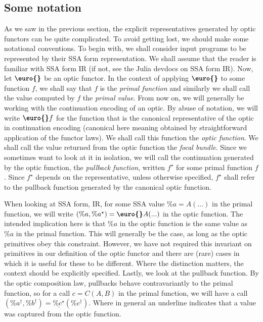 \documentclass[letterpaper, 10 pt, conference]{ieeeconf}  %
\begin{document}
\subsection{Some notation}

As we saw in the previous section, the explicit representatives generated by
optic functors can be quite complicated. To avoid getting lost, we should make
some notational conventions. To begin with, we shall consider input programs
to be represented by their SSA form representation. We shall assume that the
reader is familiar with SSA form IR (if not, see the Julia devdocs on SSA form
IR). Now, let $\textbf{\euro{}}$ be an optic functor. In the context of applying
$\textbf{\euro{}}$ to some function $f$, we shall say that $f$ is the \textit{primal
function} and similarly we shall call the value computed by $f$ the \textit{primal value}.
From now on, we will generally be working with the continuation
encoding of an optic. By abuse of notation, we will write $\textbf{\euro{}} f$
for the function that is the canonical representative of the optic in
continuation encoding (canonical here meaning obtained by straightforward
application of the functor laws). We shall call this function the \textit{optic
 function}. We shall call the value returned from the optic function the \textit{focal bundle}.
Since we sometimes want to look at it in isolation, we will call
the continuation generated by the optic function, the \textit{pullback function},
written $f^\star$ for some primal function $f$. Since $f^\star$ depends on the
representative, unless otherwise specified, $f^\star$ shall refer to the pullback
function generated by the canonical optic function.

When looking at SSA form, IR, for some SSA value $\%a = A(...)$ in the primal function,
we will write $(\%a, \%a^\star) = \textbf{\euro{}} A(...)$ in the optic function.
The intended implication here is that $\%a$ in the optic function is the same value
as $\%a$ in the primal function. This will generally be the case, as long as
the optic primitives obey this constraint. However, we have not required this
invariant on primitives in our definition of the optic functor and there are
(rare) cases in which it is useful for these to be different. Where the
distinction matters, the context should be explicitly specified.
Lastly, we look at the pullback function. By the optic composition law,
pullbacks behave contravariantly to the primal function, so for a call
$c = C(A, B)$ in the primal function, we will have a call
$(\%a^\dagger, \%b^\dagger) = \underline{\%c^\star}(\%c^\dagger)$. Where in general
an underline indicates that a value was captured from the optic function.
\end{document}
